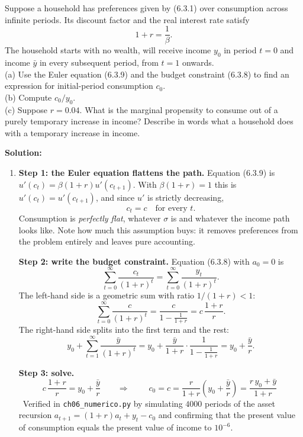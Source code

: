\documentclass[12pt, letterpaper]{article}
\begin{document}
\begin{tcolorbox}[evenbox,title={Problem 6.8 \quad The Marginal Propensity to Consume}]
\begin{tcolorbox}[questionbox]
Suppose a household has preferences given by (6.3.1) over consumption across infinite
periods. Its discount factor and the real interest rate satisfy
\[
1+r=\frac{1}{\beta} .
\]
The household starts with no wealth, will receive income $y_0$ in period $t=0$ and income
$\bar y$ in every subsequent period, from $t=1$ onwards.\\[3pt]
(a) Use the Euler equation (6.3.9) and the budget constraint (6.3.8) to find an expression
for initial-period consumption $c_0$.\\[3pt]
(b) Compute $c_0/y_0$.\\[3pt]
(c) Suppose $r=0.04$. What is the marginal propensity to consume out of a purely temporary
increase in income? Describe in words what a household does with a temporary increase in
income.
\end{tcolorbox}

\textbf{Solution:}
\begin{enumerate}

\item \textbf{Step 1: the Euler equation flattens the path.} Equation (6.3.9) is
$u'(c_t)=\beta(1+r)u'(c_{t+1})$. With $\beta(1+r)=1$ this is $u'(c_t)=u'(c_{t+1})$, and
since $u'$ is strictly decreasing,
\[
c_t=c\quad\text{for every }t .
\]
Consumption is \emph{perfectly flat}, whatever $\sigma$ is and whatever the income path
looks like. Note how much this assumption buys: it removes preferences from the problem
entirely and leaves pure accounting.

\smallskip
\textbf{Step 2: write the budget constraint.} Equation (6.3.8) with $a_0=0$ is
\[
\sum_{t=0}^{\infty}\frac{c_t}{(1+r)^t}=\sum_{t=0}^{\infty}\frac{y_t}{(1+r)^t} .
\]
The left-hand side is a geometric sum with ratio $1/(1+r)<1$:
\[
\sum_{t=0}^{\infty}\frac{c}{(1+r)^t}=\frac{c}{1-\frac{1}{1+r}}=c\,\frac{1+r}{r} .
\]
The right-hand side splits into the first term and the rest:
\[
y_0+\sum_{t=1}^{\infty}\frac{\bar y}{(1+r)^t}
=y_0+\frac{\bar y}{1+r}\cdot\frac{1}{1-\frac{1}{1+r}}
=y_0+\frac{\bar y}{r} .
\]

\smallskip
\textbf{Step 3: solve.}
\[
c\,\frac{1+r}{r}=y_0+\frac{\bar y}{r}
\qquad\Longrightarrow\qquad
\boxed{\;c_0=c=\frac{r}{1+r}\left(y_0+\frac{\bar y}{r}\right)=\frac{r\,y_0+\bar y}{1+r}\;}
\]
\checkmark\ Verified in \texttt{ch06\_numerico.py} by simulating $4000$ periods of the asset
recursion $a_{t+1}=(1+r)a_t+y_t-c_0$ and confirming that the present value of consumption
equals the present value of income to $10^{-6}$.


\end{enumerate}
\end{tcolorbox}
\end{document}
